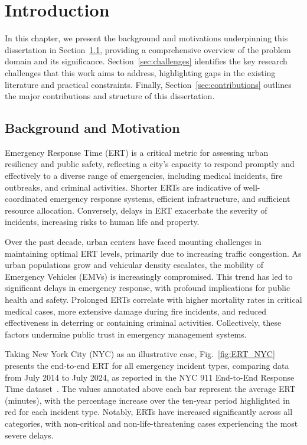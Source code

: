 \chapter{Introduction}

In this chapter, we present the background and motivations underpinning this dissertation in Section~\ref{sec:background}, providing a comprehensive overview of the problem domain and its significance. Section~\ref{sec:challenges} identifies the key research challenges that this work aims to address, highlighting gaps in the existing literature and practical constraints. Finally, Section~\ref{sec:contributions} outlines the major contributions and structure of this dissertation.

\section{Background and Motivation}\label{sec:background}

Emergency Response Time (ERT) is a critical metric for assessing urban resiliency and public safety, reflecting a city's capacity to respond promptly and effectively to a diverse range of emergencies, including medical incidents, fire outbreaks, and criminal activities. Shorter ERTs are indicative of well-coordinated emergency response systems, efficient infrastructure, and sufficient resource allocation. Conversely, delays in ERT exacerbate the severity of incidents, increasing risks to human life and property.

Over the past decade, urban centers have faced mounting challenges in maintaining optimal ERT levels, primarily due to increasing traffic congestion. As urban populations grow and vehicular density escalates, the mobility of Emergency Vehicles (EMVs) is increasingly compromised. This trend has led to significant delays in emergency response, with profound implications for public health and safety. Prolonged ERTs correlate with higher mortality rates in critical medical cases, more extensive damage during fire incidents, and reduced effectiveness in deterring or containing criminal activities. Collectively, these factors undermine public trust in emergency management systems.

Taking New York City (NYC) as an illustrative case, Fig.~\ref{fig:ERT_NYC} presents the end-to-end ERT for all emergency incident types, comparing data from July 2014 to July 2024, as reported in the NYC 911 End-to-End Response Time dataset~\cite{NYC911Data}. The values annotated above each bar represent the average ERT (minutes), with the percentage increase over the ten-year period highlighted in red for each incident type. Notably, ERTs have increased significantly across all categories, with non-critical and non-life-threatening cases experiencing the most severe delays.

